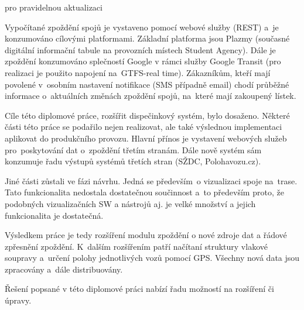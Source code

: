 	
 pro pravidelnou aktualizaci
	
	

Vypočítané zpoždění spojů je vystaveno pomocí webové služby (REST) a~je konzumováno cílovými platformami. Základní platforma jsou Plazmy (současné digitální informační tabule na provozních místech Student Agency). Dále je zpoždění konzumováno splečností Google v rámci služby Google Transit (pro realizaci je použito napojení na~GTFS-real time). Zákazníkům, kteří mají povolené v~osobním nastavení notifikace (SMS případně email) chodí průběžné informace o~aktuálních změnách zpoždění spojů, na~které mají zakoupený lístek.

Cíle této diplomové práce, rozšířit dispečinkový systém, bylo dosaženo. Některé části této práce se podařilo nejen realizovat, ale také výslednou implementaci aplikovat do produkčního provozu. Hlavní přínos je vystavení webových služeb pro~poskytování dat o~zpoždění třetím stranám. Dále nově systém sám konzumuje řadu výstupů systémů třetích stran (SŽDC, Polohavozu.cz). 

Jiné části zůstali ve fázi návrhu. Jedná se především~o vizualizaci spoje na~trase. Tato funkcionalita nedostala dostatečnou součinnost a~to především proto, že podobných vizualizačních SW a nástrojů aj. je velké množství a jejich funkcionalita je dostatečná.

Výsledkem práce je tedy rozšíření modulu zpoždění o nové zdroje dat a řádové zpřesnění zpoždění. K~dalším rozšířením patří načítaní struktury vlakové soupravy a~určení polohy jednotlivých vozů pomocí GPS. Všechny nová data jsou zpracovány a~dále distribuovány.

Řešení popsané v této diplomové práci nabízí řadu možností na rozšíření či úpravy.


